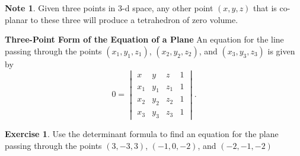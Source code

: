 \documentclass{beamer}
\newcommand{\fn}{\insertframenumber}
\theoremstyle{definition}
\newtheorem{exercise}{Exercise}
\newtheorem*{nb}{Note}
\begin{document}
\begin{frame}{\fn}
	\begin{nb}
		Given three points in 3-d space, any other point $(x,y,z)$ that is co-planar to these three will produce a tetrahedron of zero volume.
	\end{nb}
	\begin{block}{\textbf{Three-Point Form of the Equation of a Plane}}
		An equation for the line passing through the points $(x_1,y_1,z_1)$, $(x_2,y_2,z_2)$, and $(x_3,y_3,z_3)$ is given by	
		\[0=\begin{vmatrix}x&y&z&1\\x_1&y_1&z_1&1\\x_2&y_2&z_2&1\\x_3&y_3&z_3&1\end{vmatrix}.\]
	\end{block}
	\begin{exercise}
		Use the determinant formula to find an equation for the plane passing through the points $(3, -3, 3)$, $(-1, 0, -2)$, and $(-2, -1, -2)$
	\end{exercise}
\end{frame}
\end{document}
